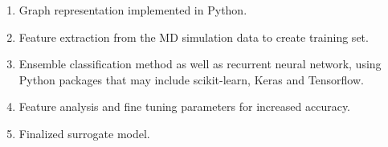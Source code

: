 \begin{enumerate}

\item {Graph representation implemented in Python.}
\item {Feature extraction from the MD simulation data to create training set.} 
\item {Ensemble classification method as well as recurrent neural network, using Python packages that may include scikit-learn, Keras and Tensorflow.} 
\item {Feature analysis and fine tuning parameters for increased accuracy.} 
\item {Finalized surrogate model.}
        
\end{enumerate}









